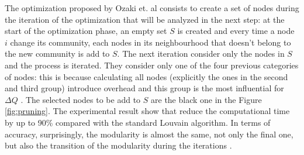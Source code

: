 The optimization proposed by Ozaki et. al consists to create a set of nodes during the iteration of the optimization that will be analyzed in the next step: at the start of the optimization phase, an empty set $S$ is created and every time a node $i$ change its community, each nodes in its neighbourhood that doesn't belong to the new community is add to $S$. The next iteration consider only the nodes in $S$ and the process is iterated. They consider only one of the four previous categories of nodes: this is because calculating all nodes (explicitly the ones in the second and third group) introduce overhead and this group is the most influential for $\Delta Q$ \cite{pruning}. The selected nodes to be add to $S$ are the black one in the Figure \ref{fig:pruning}. 
The experimental result show that reduce the computational time by up to 90\% compared with the standard Louvain algorithm. In terms of accuracy, surprisingly, the modularity is almost the same,  not only the final one, but also the transition of the modularity during the iterations \cite{pruning}. 
\newpage
